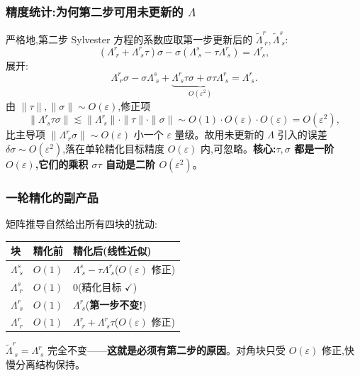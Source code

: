 \documentclass[11pt,a4paper]{article}
\begin{document}
\subsubsection*{精度统计:为何第二步可用未更新的 $\Lambda$}

严格地,第二步 Sylvester 方程的系数应取第一步更新后的 $\widetilde\Lambda^{r}_{\;r},\widetilde\Lambda^{s}_{\;s}$:
\begin{equation}
(\Lambda^{r}_{\;r}+\Lambda^{r}_{\;s}\tau)\sigma-\sigma(\Lambda^{s}_{\;s}-\tau\Lambda^{r}_{\;s})=\Lambda^{r}_{\;s},
\end{equation}
展开:
\begin{equation}
\Lambda^{r}_{\;r}\sigma-\sigma\Lambda^{s}_{\;s}+\underbrace{\Lambda^{r}_{\;s}\tau\sigma+\sigma\tau\Lambda^{r}_{\;s}}_{O(\varepsilon^2)}=\Lambda^{r}_{\;s}.
\end{equation}
由 $\|\tau\|,\|\sigma\|\sim O(\varepsilon)$,修正项
\begin{equation}
\|\Lambda^{r}_{\;s}\tau\sigma\|\lesssim\|\Lambda^{r}_{\;s}\|\cdot\|\tau\|\cdot\|\sigma\|\sim O(1)\cdot O(\varepsilon)\cdot O(\varepsilon)=O(\varepsilon^2),
\end{equation}
比主导项 $\|\Lambda^{r}_{\;r}\sigma\|\sim O(\varepsilon)$ 小一个 $\varepsilon$ 量级。故用未更新的 $\Lambda$ 引入的误差 $\delta\sigma\sim O(\varepsilon^2)$,落在单轮精化目标精度 $O(\varepsilon)$ 内,可忽略。\textbf{核心:$\tau,\sigma$ 都是一阶 $O(\varepsilon)$,它们的乘积 $\sigma\tau$ 自动是二阶 $O(\varepsilon^2)$}。

\subsubsection*{一轮精化的副产品}

矩阵推导自然给出所有四块的扰动:
\begin{center}
\begin{tabular}{lll}
\hline
块 & 精化前 & 精化后(线性近似)\\
\hline
$\Lambda^{s}_{\;s}$ & $O(1)$ & $\Lambda^{s}_{\;s}-\tau\Lambda^{r}_{\;s}$($O(\varepsilon)$ 修正)\\
$\Lambda^{s}_{\;r}$ & $O(1)$ & $0$(精化目标 $\checkmark$)\\
$\Lambda^{r}_{\;s}$ & $O(1)$ & $\Lambda^{r}_{\;s}$(\textbf{第一步不变!})\\
$\Lambda^{r}_{\;r}$ & $O(1)$ & $\Lambda^{r}_{\;r}+\Lambda^{r}_{\;s}\tau$($O(\varepsilon)$ 修正)\\
\hline
\end{tabular}
\end{center}
$\widetilde\Lambda^{r}_{\;s}=\Lambda^{r}_{\;s}$ 完全不变——\textbf{这就是必须有第二步的原因}。对角块只受 $O(\varepsilon)$ 修正,快慢分离结构保持。
\end{document}
